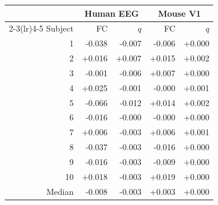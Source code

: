 \begin{tabular}{rrrrr}
\toprule
 & \multicolumn{2}{c}{Human EEG} & \multicolumn{2}{c}{Mouse V1} \\
\cmidrule(lr){2-3}\cmidrule(lr){4-5}
Subject & FC & $q$ & FC & $q$ \\
\midrule
1 & -0.038 & -0.007 & -0.006 & +0.000 \\
2 & +0.016 & +0.007 & +0.015 & +0.002 \\
3 & -0.001 & -0.006 & +0.007 & +0.000 \\
4 & +0.025 & -0.001 & -0.000 & +0.001 \\
5 & -0.066 & -0.012 & +0.014 & +0.002 \\
6 & -0.016 & -0.000 & -0.000 & +0.000 \\
7 & +0.006 & -0.003 & +0.006 & +0.001 \\
8 & -0.037 & -0.003 & -0.016 & +0.000 \\
9 & -0.016 & -0.003 & -0.009 & +0.000 \\
10 & +0.018 & -0.003 & +0.019 & +0.000 \\
\midrule
Median & -0.008 & -0.003 & +0.003 & +0.000 \\
\bottomrule
\end{tabular}
